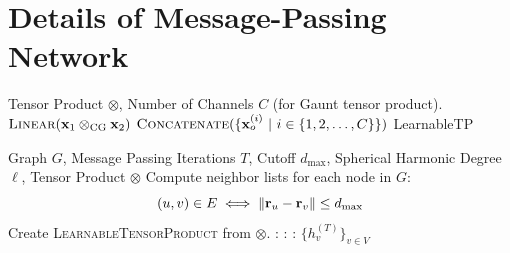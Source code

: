 \section{Details of Message-Passing Network}
\label{sec:tetris-message-passing}


\begin{algorithm}[h]
\caption{\textsc{LearnableTensorProduct}}
\label{alg:learnable-tp}
\begin{algorithmic}

\Require Tensor Product $\otimes$, Number of Channels $C$ (for Gaunt tensor product).
    \If{$\otimes = \cgtp$}
    \State \Return $\textsc{Linear}(\mathbf{x}_1 \otimes_{\mathrm{CG}} \mathbf{x}_2)$
    \EndIf
    \If{$\otimes = \gtp$}
    \EndFor
    \State \Return 
    $
    \textsc{Concatenate}(\{
    \mathbf{x}_o^{(i)} \ | \ i \in \{1, 2, \ldots, C\} \})$
    \EndIf
\EndProcedure
\State \Return LearnableTP
\end{algorithmic}
\end{algorithm}

\begin{algorithm}[h]
\caption{Operation of our Message Passing Neural Network}
\label{alg:mpnn}
\begin{algorithmic}
\Require Graph $G$, Message Passing Iterations $T$, Cutoff $d_{\text{max}}$, Spherical Harmonic Degree $\ell$, Tensor Product $\otimes$
\State Compute neighbor lists for each node in $G$:
$$(u, v) \in E \iff \left\|\mathbf{r}_u - \mathbf{r}_v\right\| \leq d_{\text{max}}$$
\State Create \textsc{LearnableTensorProduct} from $\otimes$.
:
\EndFor
{}:
:
\EndFor
\EndFor
\State \Return $\{h_v^{(T)}\}_{v \in V}$  
\end{algorithmic}
\end{algorithm}


